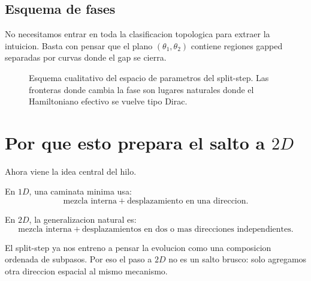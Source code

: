 \subsection{Esquema de fases}

No necesitamos entrar en toda la clasificacion topologica para extraer la intuicion. Basta con pensar que el plano \((\theta_1,\theta_2)\) contiene regiones gapped separadas por curvas donde el gap se cierra.

\begin{figure}[ht]
\centering
{}
\caption{Esquema cualitativo del espacio de parametros del split-step. Las fronteras donde cambia la fase son lugares naturales donde el Hamiltoniano efectivo se vuelve tipo Dirac.}
\label{c04:fig:split-phase}
\end{figure}

\section{Por que esto prepara el salto a \(2D\)}

Ahora viene la idea central del hilo.

En \(1D\), una caminata minima usa:
\begin{equation}
\text{mezcla interna} + \text{desplazamiento en una direccion}.
\end{equation}

En \(2D\), la generalizacion natural es:
\begin{equation}
\text{mezcla interna} + \text{desplazamientos en dos o mas direcciones independientes}.
\end{equation}

El split-step ya nos entreno a pensar la evolucion como una composicion ordenada de subpasos. Por eso el paso a \(2D\) no es un salto brusco: solo agregamos otra direccion espacial al mismo mecanismo.

